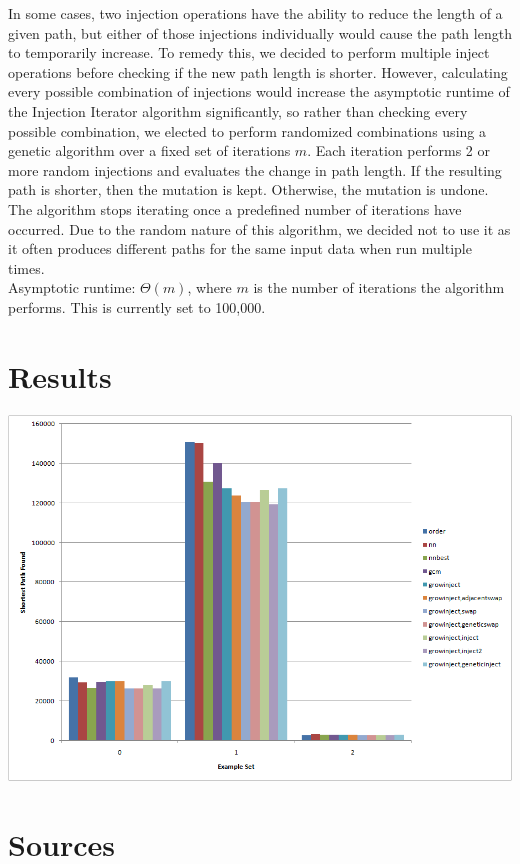\documentclass{article}
\begin{document}
In some cases, two injection operations have the ability to reduce the length
of a given path, but either of those injections individually would cause the
path length to temporarily increase. To remedy this, we decided to perform
multiple inject operations before checking if the new path length is shorter.
However, calculating every possible combination of injections would increase
the asymptotic runtime of the Injection Iterator algorithm significantly, so rather than checking every possible combination, we
elected to perform randomized combinations using a genetic algorithm over a
fixed set of iterations $m$. Each iteration performs 2 or more random
injections and evaluates the change in path length. If the resulting path is
shorter, then the mutation is kept. Otherwise, the mutation is undone. The
algorithm stops iterating once a predefined number of iterations have occurred.
Due to the random nature of this algorithm, we decided not to use it as it
often produces different paths for the same input data when run multiple
times.\\Asymptotic runtime: $\Theta (m)$, where $m$ is the number of iterations
the algorithm performs. This is currently set to 100,000.

\part*{Results}

\includegraphics{output.png}

\part*{Sources}
\end{document}
